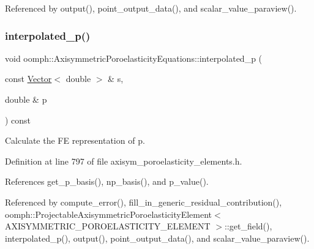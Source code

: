 Referenced by output(), point\+\_\+output\+\_\+data(), and scalar\+\_\+value\+\_\+paraview().

\mbox{\label{classoomph_1_1AxisymmetricPoroelasticityEquations_aa94e8cbc21d4433ead328a8a365162ff}} 
\subsubsection{\texorpdfstring{interpolated\+\_\+p()}{interpolated\_p()}\hspace{0.1cm}{\footnotesize\ttfamily [1/2]}}
{\footnotesize\ttfamily void oomph\+::\+Axisymmetric\+Poroelasticity\+Equations\+::interpolated\+\_\+p (\begin{DoxyParamCaption}\item[{const \hyperlink{classoomph_1_1Vector}{Vector}$<$ double $>$ \&}]{s,  }\item[{double \&}]{p }\end{DoxyParamCaption}) const\hspace{0.3cm}{\ttfamily [inline]}}



Calculate the FE representation of p. 



Definition at line 797 of file axisym\+\_\+poroelasticity\+\_\+elements.\+h.



References get\+\_\+p\+\_\+basis(), np\+\_\+basis(), and p\+\_\+value().



Referenced by compute\+\_\+error(), fill\+\_\+in\+\_\+generic\+\_\+residual\+\_\+contribution(), oomph\+::\+Projectable\+Axisymmetric\+Poroelasticity\+Element$<$ A\+X\+I\+S\+Y\+M\+M\+E\+T\+R\+I\+C\+\_\+\+P\+O\+R\+O\+E\+L\+A\+S\+T\+I\+C\+I\+T\+Y\+\_\+\+E\+L\+E\+M\+E\+N\+T $>$\+::get\+\_\+field(), interpolated\+\_\+p(), output(), point\+\_\+output\+\_\+data(), and scalar\+\_\+value\+\_\+paraview().

\mbox{\label{classoomph_1_1AxisymmetricPoroelasticityEquations_abcc938c4746b72a49ac6e45a5f6366b1}} 
